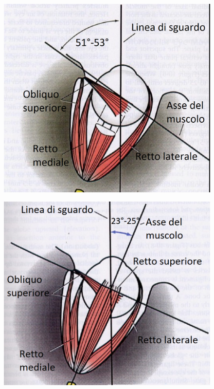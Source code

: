 \begin{figure}[h!]
\centering
\begin{minipage}{.5\textwidth}
  \centering
  \includegraphics[scale=0.25]{source/immagini/Assi_obliqui.png}
  \label{fig:test8}
\end{minipage}%
\begin{minipage}{.5\textwidth}
  \centering
  \includegraphics[scale=0.34]{source/immagini/Assi_retti.png}
  \label{fig:test9}
\end{minipage}
\end{figure} 

